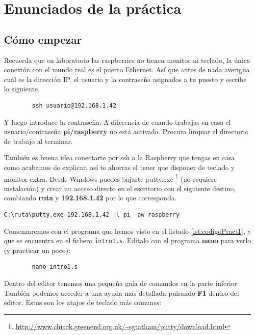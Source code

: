 \section{Enunciados de la práctica}

\subsection{Cómo empezar}

Recuerda que en laboratorio las raspberries no tienen
monitor ni teclado, la única conexión con el mundo real
es el puerto Ethernet. Así que antes de nada averigua cuál es la
dirección IP, el usuario y la contraseña asignados a tu puesto
y escribe lo siguiente.

\begin{lstlisting}
        ssh usuario@192.168.1.42
\end{lstlisting}

Y luego introduce la contraseña. A diferencia de cuando trabajas en casa
el usuario/contraseña {\bf pi/raspberry} no está activado. Procura limpiar
el directorio de trabajo al terminar.

También es buena idea conectarte por ssh a la Raspberry que tengas en casa
como acabamos de explicar, así te ahorras el tener que disponer de teclado
y monitor extra. Desde Windows puedes bajarte putty.exe 
\footnote{\url{http://www.chiark.greenend.org.uk/~sgtatham/putty/download.html}}
(no requiere instalación) y crear un acceso directo en el escritorio con
el siguiente destino, cambiando {\bf ruta} y {\bf 192.168.1.42} por lo que
corresponda.

\begin{lstlisting}
C:\ruta\putty.exe 192.168.1.42 -l pi -pw raspberry
\end{lstlisting}

Comenzaremos con el programa que hemos visto en el listado
\ref{lst:codigoPract1}, y que se encuentra en el fichero {\tt intro1.s}.
Edítalo con el programa {\bf nano} para verlo (y practicar un poco):

\begin{lstlisting}
        nano intro1.s
\end{lstlisting}

Dentro del editor tenemos una pequeña guía de comandos en la parte
inferior. También podemos acceder a una ayuda más detallada pulsando {\bf F1}
dentro del editor. Estos son los atajos de teclado más comunes:

